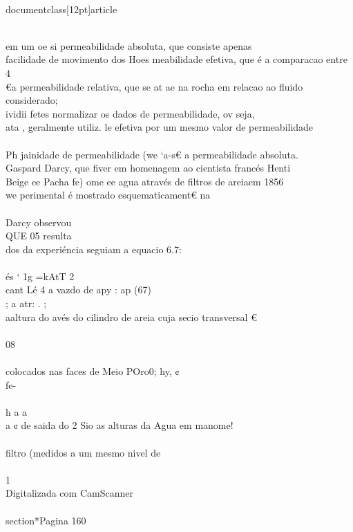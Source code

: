\\documentclass[12pt]{article}
\begin{document}
\\
em um oe si permeabilidade absoluta, que consiste apenas\\
facilidade de movimento dos Hoes meabilidade efetiva, que é a comparacao entre 4\\
€a permeabilidade relativa, que se at ae na rocha em relacao ao fluido considerado;\\
ividii fetes normalizar os dados de permeabilidade, ov seja,\\
ata , geralmente utiliz. le efetiva por um mesmo valor de permeabilidade\\
\\
Ph jainidade de permeabilidade (we ‘a-s€ a permeabilidade absoluta.\\
Gaspard Darcy, que fiver em homenagem ao cientista francés Henti\\
Beige ee Pacha fe) ome ee agua através de filtros de areiaem 1856\\
we perimental é mostrado esquematicament€ na\\
\\
Darcy observou\\
QUE 05 resulta\\
dos da experiéncia seguiam a equacio 6.7:\\
\\
és ‘ 1g =kAtT 2\\
cant Lé 4 a vazdo de apy : ap (67)\\
; a atr: . ;\\
aaltura do avés do cilindro de areia cuja secio transversal €\\
\\
08\\
\\
colocados nas faces de Meio POro0; hy, ¢\\
fe-\\
\\
h a a\\
a ¢ de saida do 2 Sio as alturas da Agua em manome!\\
\\
filtro (medidos a um mesmo nivel de\\
\\
1\\
Digitalizada com CamScanner\\

\\section*{Pagina 160}
\end{document}
